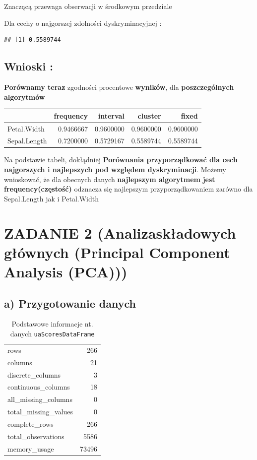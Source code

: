 \documentclass[
  12pt,
]{article}
\begin{document}
Znaczącą przewaga obserwacji w środkowym przedziale

Dla cechy o najgorszej zdolności dyskryminacyjnej :

\begin{verbatim}
## [1] 0.5589744
\end{verbatim}

\subsection{Wnioski :}\label{wnioski}

\textbf{Porównamy teraz} zgodności procentowe \textbf{wyników}, dla
\textbf{poszczególnych algorytmów}

\begin{longtable}[]{@{}lrrrr@{}}
\toprule\noalign{}
& frequency & interval & cluster & fixed \\
\midrule\noalign{}
\endhead
\bottomrule\noalign{}
\endlastfoot
Petal.Width & 0.9466667 & 0.9600000 & 0.9600000 & 0.9600000 \\
Sepal.Length & 0.7200000 & 0.5729167 & 0.5589744 & 0.5589744 \\
\end{longtable}

Na podstawie tabeli, dokłądniej \textbf{Porównania przyporządkować dla
cech najgorszych i najlepszych pod względem dyskryminacji}. Możemy
wnioskować, że dla obecnych danych \textbf{najlepszym algorytmem}
\textbf{jest frequency(częstość)} odznacza się najlepszym
przyporządkowaniem zarówno dla Sepal.Length jak i Petal.Width

\section{ZADANIE 2 (Analizaskładowych głównych (Principal Component
Analysis
(PCA)))}\label{zadanie-2-analizaskux142adowych-gux142uxf3wnych-principal-component-analysis-pca}

\subsection{a) Przygotowanie danych}\label{a-przygotowanie-danych}

\begin{longtable}[]{@{}lr@{}}
\caption{Podstawowe informacje nt. danych
\texttt{uaScoresDataFrame}}\tabularnewline
\toprule\noalign{}
\endfirsthead
\endhead
\bottomrule\noalign{}
\endlastfoot
rows & 266 \\
columns & 21 \\
discrete\_columns & 3 \\
continuous\_columns & 18 \\
all\_missing\_columns & 0 \\
total\_missing\_values & 0 \\
complete\_rows & 266 \\
total\_observations & 5586 \\
memory\_usage & 73496 \\
\end{longtable}
\end{document}
